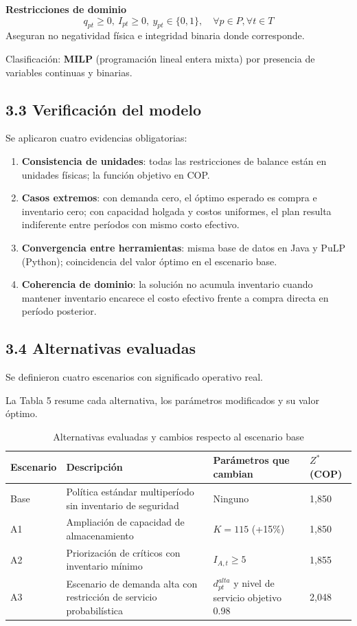 \documentclass[12pt,letterpaper]{article}
\begin{document}
\textbf{Restricciones de dominio}
\begin{equation}
q_{pt}\ge 0,\ I_{pt}\ge 0,\ y_{pt}\in\{0,1\},\quad \forall p\in P,\forall t\in T
\end{equation}
Aseguran no negatividad física e integridad binaria donde corresponde.

Clasificación: \textbf{MILP} (programación lineal entera mixta) por presencia de variables continuas y binarias.

\subsection{3.3 Verificación del modelo}
Se aplicaron cuatro evidencias obligatorias:
\begin{enumerate}[leftmargin=*]
	\item \textbf{Consistencia de unidades}: todas las restricciones de balance están en unidades físicas; la función objetivo en COP.
	\item \textbf{Casos extremos}: con demanda cero, el óptimo esperado es compra e inventario cero; con capacidad holgada y costos uniformes, el plan resulta indiferente entre períodos con mismo costo efectivo.
	\item \textbf{Convergencia entre herramientas}: misma base de datos en Java y PuLP (Python); coincidencia del valor óptimo en el escenario base.
	\item \textbf{Coherencia de dominio}: la solución no acumula inventario cuando mantener inventario encarece el costo efectivo frente a compra directa en período posterior.
\end{enumerate}

\subsection{3.4 Alternativas evaluadas}
Se definieron cuatro escenarios con significado operativo real.

La Tabla 5 resume cada alternativa, los parámetros modificados y su valor óptimo.
\begin{table}[H]
\centering
\caption{Alternativas evaluadas y cambios respecto al escenario base}
\begin{tabular}{|p{2.3cm}|p{5.4cm}|p{4.2cm}|p{2.1cm}|}
\hline
\textbf{Escenario} & \textbf{Descripción} & \textbf{Parámetros que cambian} & \textbf{$Z^*$ (COP)} \\
\hline
Base & Política estándar multiperíodo sin inventario de seguridad & Ninguno & 1,850 \\
\hline
A1 & Ampliación de capacidad de almacenamiento & $K=115$ (+15\%) & 1,850 \\
\hline
A2 & Priorización de críticos con inventario mínimo & $I_{A,t}\ge 5$ & 1,855 \\
\hline
A3 & Escenario de demanda alta con restricción de servicio probabilística & $d_{pt}^{alta}$ y nivel de servicio objetivo 0.98 & 2,048 \\
\hline
\end{tabular}
\end{table}
\end{document}
